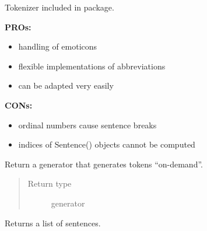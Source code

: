 \documentclass[letterpaper,10pt,english]{sphinxmanual}
\begin{document}

\begin{fulllineitems}
\label{api_reference:textblob_de.tokenizers.PatternTokenizer}
Tokenizer included in  package.

\textbf{PROs:}
\begin{itemize}
\item {} 
handling of emoticons

\item {} 
flexible implementations of abbreviations

\item {} 
can be adapted very easily

\end{itemize}

\textbf{CONs:}
\begin{itemize}
\item {} 
ordinal numbers cause sentence breaks

\item {} 
indices of Sentence() objects cannot be computed

\end{itemize}

\begin{fulllineitems}
\label{api_reference:textblob_de.tokenizers.PatternTokenizer.itokenize}
Return a generator that generates tokens ``on-demand''.

\begin{quote}\begin{description}
\item[{Return type}] \leavevmode
generator

\end{description}\end{quote}

\end{fulllineitems}


\begin{fulllineitems}
\label{api_reference:textblob_de.tokenizers.PatternTokenizer.sent_tokenize}
Returns a list of sentences.


\end{fulllineitems}
\end{fulllineitems}
\end{document}
